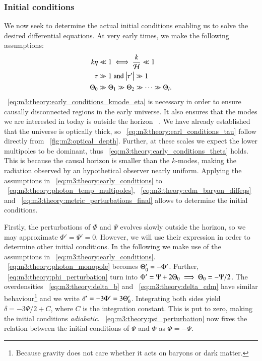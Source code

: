 \subsubsection{Initial conditions}
        We now seek to determine the actual initial conditions enabling us to solve the desired differential equations. At very early times, we make the following assumptions:
        \begin{subequations}\label{eq:m3:theory:early_conditions}
            \begin{align}
                k\eta &\ll 1 \iff \frac{k}{\mathcal{H}}\ll1\label{eq:m3:theory:early_conditions_kmode_eta}\\
                \tau &\gg 1 \text{ and } \abs{\tau'}\gg1 \label{eq:m3:theory:earl_conditions_tau} \\
                \Theta_0&\gg\Theta_1\gg\Theta_2\gg\dots\gg\Theta_l \label{eq:m3:theory:early_conditions_theta}.
            \end{align}
        \end{subequations}
        ~\cref{eq:m3:theory:early_conditions_kmode_eta} is necessary in order to ensure causally disconnected regions in the early universe. It also ensures that the modes we are interested in today is outside the horizon ~\cite{AST5220LectureNotes}. We have already established that the universe is optically thick, so ~\cref{eq:m3:theory:earl_conditions_tau} follow directly from ~\cref{fig:m2:optical_depth}. Further, at these scales we expect the lower multipoles to be dominant, thus ~\cref{eq:m3:theory:early_conditions_theta} holds. This is because the causal horizon is smaller than the $k$-modes, making the radiation observed by an hypothetical observer nearly uniform. Applying the assumptions in ~\cref{eq:m3:theory:early_conditions} to ~\cref{eq:m3:theory:photon_temp_multipoles}, ~\cref{eq:m3:theory:cdm_baryon_diffeqs} and ~\cref{eq:m3:theory:metric_perturbations_final} allows to determine the initial conditions. 

        Firstly, the perturbations of $\Phi$ and $\Psi$ evolves slowly outside the horizon, so we may approximate $\Phi'=\Psi'=0$. However, we will use their expression in order to determine other initial conditions. In the following we make use of the assumptions in ~\cref{eq:m3:theory:early_conditions}. ~\cref{eq:m3:theory:photon_monopole} becomes $\Theta_0'=-\Phi'$. Further, ~\cref{eq:m3:theory:phi_perturbation} turn into $\Phi'=\Psi+2\Theta_0 \implies \Theta_0=-\Psi/2$. The overdensities ~\cref{eq:m3:theory:delta_b} and ~\cref{eq:m3:theory:delta_cdm} have similar behaviour\footnote{Because gravity does not care whether it acts on baryons or dark matter.} and we write $\delta'=-3\Phi' = 3\Theta_0'$. Integrating both sides yield $\delta=-3\Psi/2 + C$, where $C$ is the integration constant. This is put to zero, making the initial conditions \textit{adiabatic}. ~\cref{eq:m3:theory:psi_perturbation} now fixes the relation between the initial conditions of $\Psi$ and $\Phi$ as $\Phi = -\Psi$. 


